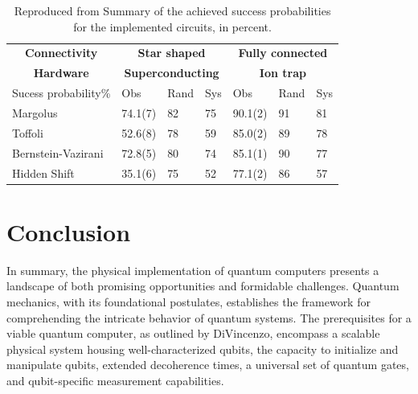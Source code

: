 \documentclass[
  journal=largetwo,
  year=2023,
]{cup-journal}
\begin{document}
\begin{table}[]
  \begin{tabular}{lllllll}
    \multicolumn{1}{c}{\textbf{Connectivity}} & \multicolumn{3}{c}{\textbf{Star shaped}}     & \multicolumn{3}{c}{\textbf{Fully connected}}                              \\
    \multicolumn{1}{c}{\textbf{Hardware}}     & \multicolumn{3}{c}{\textbf{Superconducting}} & \multicolumn{3}{c}{\textbf{Ion trap}}                                     \\
    Sucess probability\%                      & Obs                                          & Rand                                         & Sys & Obs     & Rand & Sys \\
    Margolus                                  & 74.1(7)                                      & 82                                           & 75  & 90.1(2) & 91   & 81  \\
    Toffoli                                   & 52.6(8)                                      & 78                                           & 59  & 85.0(2) & 89   & 78  \\
    Bernstein-Vazirani                        & 72.8(5)                                      & 80                                           & 74  & 85.1(1) & 90   & 77  \\
    Hidden Shift                              & 35.1(6)                                      & 75                                           & 52  & 77.1(2) & 86   & 57  \\
  \end{tabular}
  \caption{
    Reproduced from \autocite[6]{linke_2017_experimental} Summary of the achieved success probabilities for
    the implemented circuits, in percent.
  }
\end{table}

\section{Conclusion}

In summary, the physical implementation of quantum computers presents a landscape of both promising opportunities and formidable challenges. Quantum mechanics, with its foundational postulates, establishes the framework for comprehending the intricate behavior of quantum systems. The prerequisites for a viable quantum computer, as outlined by DiVincenzo, encompass a scalable physical system housing well-characterized qubits, the capacity to initialize and manipulate qubits, extended decoherence times, a universal set of quantum gates, and qubit-specific measurement capabilities.
\end{document}
